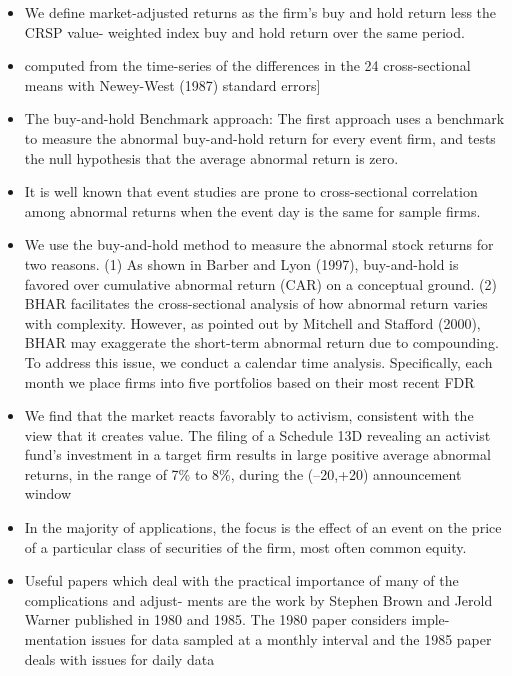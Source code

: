 \documentclass[12pt]{article}
\begin{document}
\begin{itemize}
        \item We define market-adjusted returns as the firm’s buy and hold return less the CRSP value-
        weighted index buy and hold return over the same period. \citep{Choi2012}
        \item computed from the time-series of the differences in the 24 cross-sectional means with Newey-West (1987) standard errors] \citep{Choi2012}
        \item The buy-and-hold Benchmark approach: The first approach uses a benchmark to measure the abnormal buy-and-hold return for every event firm, and tests the null hypothesis that the average abnormal return is zero.\citep{ang2011}
        \item It is well known that event studies are prone to cross-sectional correlation among abnormal returns when the event day is the same for sample firms. \citep{Kolari2010}
        \item We use the buy-and-hold method to measure the abnormal stock returns for two
        reasons. (1) As shown in Barber and Lyon (1997), buy-and-hold is favored over cumulative abnormal return (CAR) on a conceptual ground. (2) BHAR facilitates the cross-sectional analysis of how abnormal return varies with complexity. However, as pointed out by Mitchell and Stafford (2000), BHAR may exaggerate the short-term abnormal return due to compounding. To address this issue, we conduct a calendar time analysis. Specifically, each month we place firms into five portfolios based on their most recent FDR \citep{You2009}
        \item We find that the market reacts favorably to activism, consistent with the view that it creates value. The filing of a Schedule 13D revealing an activist fund’s investment in a target firm results in large positive average abnormal returns, in the range
        of 7\% to 8\%, during the (–20,+20) announcement window \citep{Brav2008}
        \item In the majority of applications, the focus is the effect of an event on the price of a particular class of securities of the firm, most often common equity. \citep{MacKinlay1997}
        \item Useful papers which deal with the practical importance of many of the complications and adjust- ments are the work by Stephen Brown and Jerold Warner published in 1980 and 1985. The 1980 paper considers imple- mentation issues for data sampled at a monthly interval and the 1985 paper deals with issues for daily data \citep{MacKinlay1997}

\end{itemize}
\end{document}

